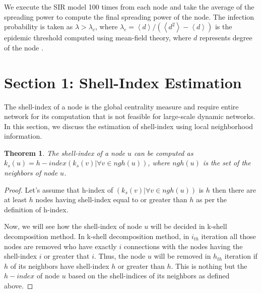 \documentclass[conference]{IEEEtran}
\newtheorem{theorem}{Theorem}
\newtheorem{statement}{Statement}
\begin{document}
We execute the SIR model 100 times from each node and take the average of the spreading power to compute the final spreading power of the node. The infection probability is taken as $\lambda > \lambda_c$, where $\lambda_c=\left \langle d \right \rangle/(\left \langle d^2 \right \rangle - \left \langle d \right \rangle)$ is the epidemic threshold computed using mean-field theory, where $d$ represents degree of the node \cite{castellano2010thresholds}.

\section{Section 1: Shell-Index Estimation}\label{section1}


The shell-index of a node is the global centrality measure and require entire network for its computation that is not feasible for large-scale dynamic networks. In this section, we discuss the estimation of shell-index using local neighborhood information.

\begin{theorem}
The shell-index of a node $u$ can be computed as $k_s(u)=h-index(k_s(v) | \forall v \in ngh(u))$, where $ngh(u)$ is the set of the neighbors of node $u$.
\end{theorem}


\begin{proof}
Let's assume that h-index of $(k_s(v) | \forall v \in ngh(u))$ is $h$ then there are at least $h$ nodes having shell-index equal to or greater than $h$ as per the definition of h-index.

Now, we will see how the shell-index of node $u$ will be decided in k-shell decomposition method. In k-shell decomposition method, in $i_{th}$ iteration all those nodes are removed who have exactly $i$ connections with the nodes having the shell-index $i$ or greater that $i$. Thus, the node $u$ will be removed in $h_{th}$ iteration if $h$ of its neighbors have shell-index $h$ or greater than $h$. This is nothing but the $h-index$ of node $u$ based on the shell-indices of its neighbors as defined above. 
\end{proof}
\end{document}
